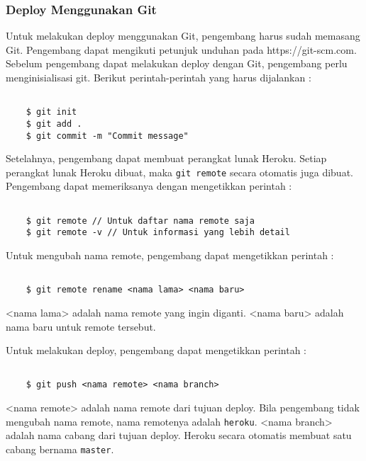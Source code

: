\subsubsection{Deploy Menggunakan Git}
Untuk melakukan deploy menggunakan Git, pengembang harus sudah memasang Git. Pengembang dapat mengikuti petunjuk unduhan pada https://git-scm.com. Sebelum pengembang dapat melakukan deploy dengan Git, pengembang perlu menginisialisasi git. Berikut perintah-perintah yang harus dijalankan :
\begin{lstlisting}

	$ git init
	$ git add .
	$ git commit -m "Commit message"

\end{lstlisting}

Setelahnya, pengembang dapat membuat perangkat lunak Heroku. Setiap perangkat lunak Heroku dibuat, maka \texttt{git remote} secara otomatis juga dibuat. Pengembang dapat memeriksanya dengan mengetikkan perintah :
\begin{lstlisting}

	$ git remote // Untuk daftar nama remote saja
	$ git remote -v // Untuk informasi yang lebih detail

\end{lstlisting}

Untuk mengubah nama remote, pengembang dapat mengetikkan perintah :
\begin{lstlisting}

	$ git remote rename <nama lama> <nama baru>

\end{lstlisting}
<nama lama> adalah nama remote yang ingin diganti. <nama baru> adalah nama baru untuk remote tersebut.

Untuk melakukan deploy, pengembang dapat mengetikkan perintah :
\begin{lstlisting}

	$ git push <nama remote> <nama branch>

\end{lstlisting}
<nama remote> adalah nama remote dari tujuan deploy. Bila pengembang tidak mengubah nama remote, nama remotenya adalah \texttt{heroku}. <nama branch> adalah nama cabang dari tujuan deploy. Heroku secara otomatis membuat satu cabang bernama \texttt{master}. 

